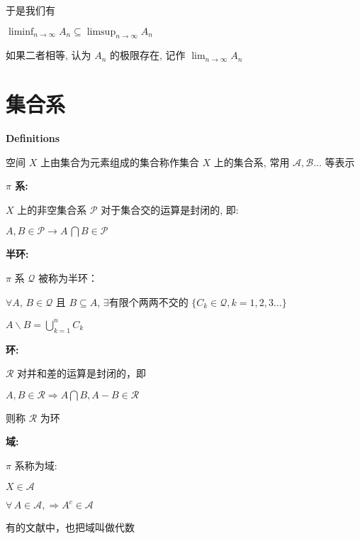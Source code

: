 \documentclass[UTF8]{book}
\begin{document}
于是我们有\par
 $ \liminf_{n\to \infty} A_n\subseteq \limsup_{n\to \infty} A_n $ \par
如果二者相等, 认为 $ A_n $ 的极限存在, 记作 $ \lim_{n\to \infty}A_n $ 


\newpage
\section{集合系}
\textbf{Definitions}\par
\vspace*{12pt}

空间 $ X $  上由集合为元素组成的集合称作集合  $ X $  上的集合系, 常用  $ \mathscr{A, B\ldots} $ 等表示\par

\vspace*{12pt}

\textbf{$ \pi $ 系:}\par
\quad{} $ X $ 上的非空集合系 $ \mathscr{P} $ 对于集合交的运算是封闭的, 即:\par
\quad\quad$ A, B\in \mathscr{P}\longrightarrow A\,\bigcap B \in \mathscr{P} $ \par

\vspace*{12pt}

\textbf{半环:}\par
\quad{}  $ \pi $  系  $ \mathscr{Q} $  被称为半环：\par
\quad\quad $ \forall A,\,B \in \mathscr{Q} $ 且 $ B\subseteq A$, $\exists $有限个两两不交的 $\{C_k \in \mathscr{Q}, k=1,2,3\ldots\}$\par
\quad{} $A\backslash B = \bigcup_{k=1}^nC_k$\par

\vspace*{12pt}

\textbf{环:}\par
\quad{} $\mathscr{R}$ 对并和差的运算是封闭的，即\par
\quad\quad$A, B\in \mathscr{R}\Longrightarrow  A\bigcap B, A-B\in \mathscr{R}$\par
\quad\quad 则称 $\mathscr{R}$ 为环\par

\vspace*{12pt}

\textbf{域:}\par
\quad{} $\pi$ 系称为域:\par
\quad\quad$X\in \mathscr{A}$\par
\quad\quad$\forall\,A\in \mathscr{A}, \Longrightarrow A^c\in \mathscr{A}$\par
有的文献中，也把域叫做代数\par
\end{document}
